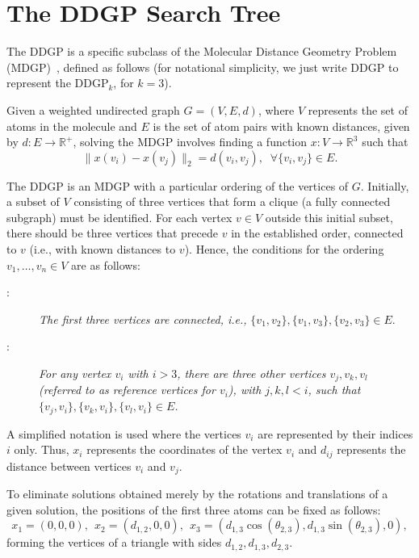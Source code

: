 \documentclass[journal=jacsat,manuscript=article]{achemso}
\begin{document}
\section{The DDGP Search Tree}\label{sec2} 

The DDGP is a specific subclass of the Molecular Distance Geometry Problem (MDGP)~\cite{liberti2014euclidean}, defined as follows {\color{red}(for notational simplicity, we just write DDGP to represent the $\text{DDGP}_k$, for $k=3$)}.

Given a weighted undirected graph $ G=(V,E,d) $, where $ V $ represents the set of atoms in the molecule and $ E $ is the set of atom pairs with known distances, given by $ d:E \rightarrow \mathbb{R}^+ $, solving the MDGP involves finding a function $ x:V \to \mathbb{R}^3 $ such that
$$
\|x(v_i) - x(v_j)\|_2 = d({v_i, v_j}),\;\;\forall \{v_i,v_j\}\in E.
$$

The DDGP is an MDGP with a particular ordering of the vertices of $ G $. Initially, a subset of $ V $ consisting of three vertices that form a clique (a fully connected subgraph) must be identified. For each vertex $ v \in V $ outside this initial subset, there should be three vertices that precede $ v $ in the established order, connected to $ v $ (i.e., with known distances to $ v $). Hence, the conditions for the ordering $ v_1, \ldots, v_n \in V $ are as follows:

\begin{description}
\item[:] \emph{The first three vertices are connected, i.e.,} \( \{v_1,v_2\},\{v_1,v_3\},\{v_2,v_3\} \in E \).
\item[:] \emph{For any vertex \( v_i \) with \( i > 3 \), there are three other vertices \( v_j, v_k, v_l \) (referred to as {reference vertices} for \( v_i \)), with \( j, k, l < i \), such that \( \{v_j,v_i\},\{v_k,v_i\},\{v_l,v_i\} \in E \).}
\end{description}

A simplified notation is used where the vertices \( v_i \) are represented by their indices \( i \) only. Thus, \( x_i \) represents the coordinates of the vertex \( v_i \) and \( d_{ij} \) represents the distance between vertices \( v_i \) and \( v_j \).

To eliminate solutions obtained merely by the rotations and translations of a given solution, the positions of the first three atoms can be fixed as follows:
\[
x_1=(0,0,0), \ \ x_2=(d_{1,2},0,0), \ \ x_3=(d_{1,3}\cos(\theta_{2,3}),d_{1,3}\sin(\theta_{2,3}), 0),
\]
forming the vertices of a triangle with sides \( d_{1,2},d_{1,3},d_{2,3} \).
\end{document}
